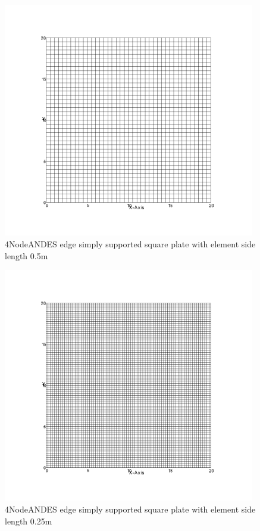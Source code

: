 \documentclass[fleqn,11pt,letter]{article}
\begin{document}
\begin{figure}[H]
  \centering
  \includegraphics[width=11cm]{../Figure_files/4NodeANDES/square_plate5.png}
  \caption{4NodeANDES edge simply supported square plate with element side length 0.5m }
  \label{fig 4NodeANDES edges simply supported square plate with element side length 0.5m }
\end{figure}

\newpage

\begin{figure}[H]
  \centering
  \includegraphics[width=11cm]{../Figure_files/4NodeANDES/square_plate6.png}
  \caption{4NodeANDES edge simply supported square plate with element side length 0.25m }
  \label{fig 4NodeANDES edges simply supported square plate with element side length 0.25m }
\end{figure}
\end{document}
